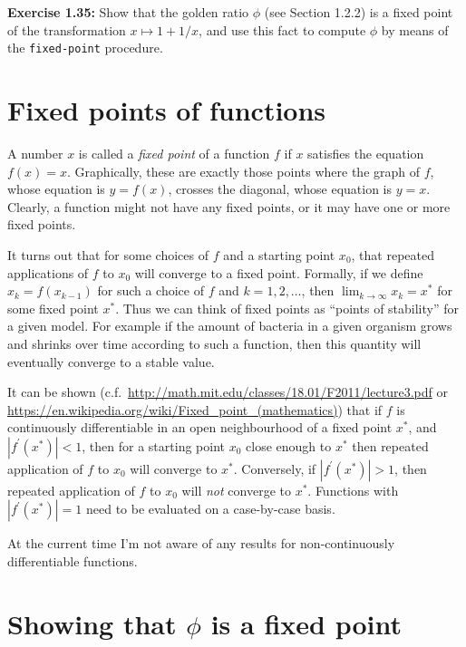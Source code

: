 \documentclass{article}
\begin{document}

\noindent \textbf{Exercise 1.35:} Show that the golden ratio $\phi$ (see Section
1.2.2) is a fixed point of the transformation $x \mapsto 1 + 1/x$, and use this
fact to compute $\phi$ by means of the \lstinline{fixed-point} procedure.

\noindent \hrulefill



\section{Fixed points of functions}

A number $x$ is called a \emph{fixed point} of a function $f$ if $x$ satisfies
the equation $f(x) = x$.  Graphically, these are exactly those points where the
graph of $f$, whose equation is $y = f(x)$, crosses the diagonal, whose equation
is $y = x$.  Clearly, a function might not have any fixed points, or it may have
one or more fixed points.

It turns out that for some choices of $f$ and a starting point $x_0$, that
repeated applications of $f$ to $x_0$ will converge to a fixed point.  Formally,
if we define $x_k = f(x_{k - 1})$ for such a choice of $f$ and
$k = 1, 2, \dots$, then $\lim_{k \rightarrow \infty} x_k = x^{*}$ for some fixed
point $x^{*}$.  Thus we can think of fixed points as ``points of stability'' for
a given model.  For example if the amount of bacteria in a given organism grows
and shrinks over time according to such a function, then this quantity will
eventually converge to a stable value.

It can be shown (c.f.\
\url{http://math.mit.edu/classes/18.01/F2011/lecture3.pdf} or
\url{https://en.wikipedia.org/wiki/Fixed_point_(mathematics)}) that if $f$ is
continuously differentiable in an open neighbourhood of a fixed point $x^{*}$,
and $|f^{\prime}(x^{*})| < 1$, then for a starting point $x_0$ close enough to
$x^{*}$ then repeated application of $f$ to $x_0$ will converge to $x^{*}$.
Conversely, if $|f^{\prime}(x^{*})| > 1$, then repeated application of $f$ to
$x_0$ will \emph{not} converge to $x^{*}$.  Functions with
$|f^{\prime}(x^{*})| = 1$ need to be evaluated on a case-by-case basis.

At the current time I'm not aware of any results for non-continuously
differentiable functions.




\section{Showing that $\phi$ is a fixed point}
\end{document}

